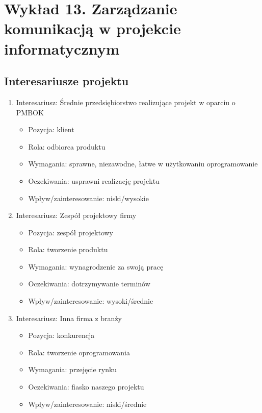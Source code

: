 \chapter{Wykład 13. Zarządzanie komunikacją w projekcie informatycznym}

\section{Interesariusze projektu}

\begin{enumerate}
	\item Interesariusz: Średnie przedsiębiorstwo realizujące projekt w oparciu o PMBOK
\begin{itemize}

	\item Pozycja: klient
	\item Rola: odbiorca produktu
	\item Wymagania: sprawne, niezawodne, łatwe w użytkowaniu oprogramowanie
	\item Oczekiwania: usprawni realizację projektu
	\item Wpływ/zainteresowanie: niski/wysokie
	\end{itemize}

	\item Interesariusz: Zespół projektowy firmy
\begin{itemize}

	\item Pozycja: zespół projektowy
	\item Rola: tworzenie produktu
	\item Wymagania: wynagrodzenie za swoją pracę
	\item Oczekiwania: dotrzymywanie terminów
	\item Wpływ/zainteresowanie: wysoki/średnie
	\end{itemize}

	\item Interesariusz: Inna firma z branży
\begin{itemize}

	\item Pozycja: konkurencja
	\item Rola: tworzenie oprogramowania
	\item Wymagania: przejęcie rynku
	\item Oczekiwania: fiasko naszego projektu
	\item Wpływ/zainteresowanie: niski/średnie
	\end{itemize}


\end{enumerate}
